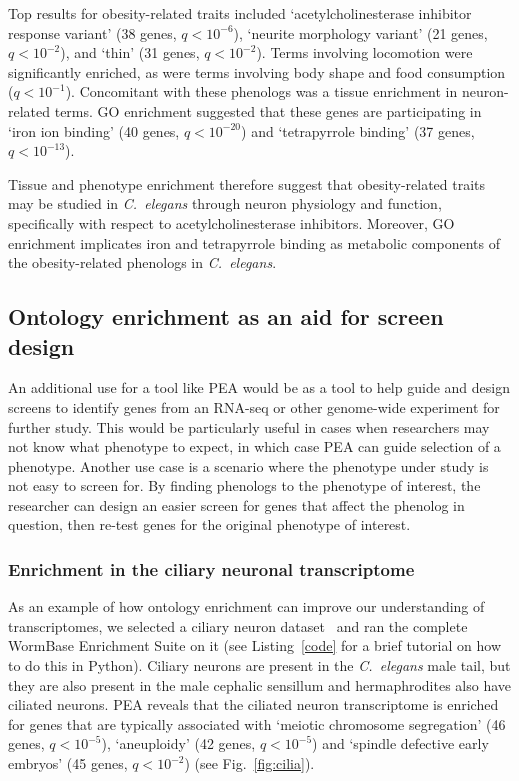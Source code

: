 \documentclass[10pt, onecolumn]{article}
\newcommand{\cel}{\emph{C.~elegans}}
\newcommand{\qval}[1]{\ensuremath{q<10^{-#1}}}
\begin{document}
Top results for obesity-related traits included `acetylcholinesterase inhibitor
response variant' (38 genes, \qval{6}), `neurite morphology variant' (21 genes,
\qval{2}), and `thin' (31 genes, \qval{2}). Terms involving locomotion were
significantly enriched, as were terms involving body shape and food consumption
(\qval{1}). Concomitant with these phenologs was a tissue enrichment in
neuron-related terms. GO enrichment suggested that these genes are participating
in `iron ion binding' (40 genes, \qval{20}) and `tetrapyrrole binding' (37
genes, \qval{13}).

Tissue and phenotype enrichment therefore suggest that obesity-related traits
may be studied in \cel{} through neuron physiology and function, specifically
with respect to acetylcholinesterase inhibitors. Moreover, GO enrichment
implicates iron and tetrapyrrole binding as metabolic components of the
obesity-related phenologs in \cel{}.

\subsection*{Ontology enrichment as an aid for screen design}
An additional use for a tool like PEA would be as a tool to help guide and
design screens to identify genes from an RNA-seq or other genome-wide experiment
for further study. This would be particularly useful in cases when researchers
may not know what phenotype to expect, in which case PEA can guide selection of
a phenotype. Another use case is a scenario where the phenotype under study is
not easy to screen for. By finding phenologs to the phenotype of interest, the
researcher can design an easier screen for genes that affect the phenolog in
question, then re-test genes for the original phenotype of interest.

\subsubsection*{Enrichment in the ciliary neuronal transcriptome}
As an example of how ontology enrichment can improve our understanding of
transcriptomes, we selected a ciliary neuron dataset~\cite{Wang2015} and ran the
complete WormBase Enrichment Suite on it (see Listing~\ref{code} for a brief
tutorial on how to do this in Python). Ciliary neurons are present in the
\cel{} male tail, but they are also present in the male cephalic sensillum and
hermaphrodites also have ciliated neurons. PEA reveals that the ciliated neuron
transcriptome is enriched for genes that are typically associated with `meiotic
chromosome segregation' (46 genes, \qval{5}), `aneuploidy' (42 genes, \qval{5})
and `spindle defective early embryos' (45 genes, \qval{2}) (see
Fig.~\ref{fig:cilia}).
\end{document}
